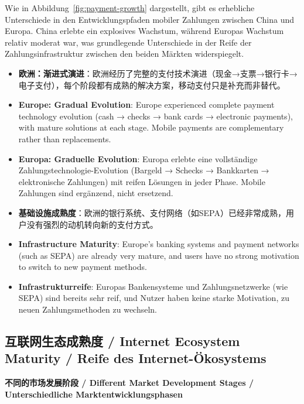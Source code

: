 \documentclass[11pt,a4paper]{article}
\begin{document}
Wie in Abbildung~\ref{fig:payment-growth} dargestellt, gibt es erhebliche Unterschiede in den Entwicklungspfaden mobiler Zahlungen zwischen China und Europa. China erlebte ein explosives Wachstum, während Europas Wachstum relativ moderat war, was grundlegende Unterschiede in der Reife der Zahlungsinfrastruktur zwischen den beiden Märkten widerspiegelt.

\begin{itemize}
    
    \item \textbf{欧洲：渐进式演进}：欧洲经历了完整的支付技术演进（现金→支票→银行卡→电子支付），每个阶段都有成熟的解决方案，移动支付只是补充而非替代。
    \item \textbf{Europe: Gradual Evolution}: Europe experienced complete payment technology evolution (cash → checks → bank cards → electronic payments), with mature solutions at each stage. Mobile payments are complementary rather than replacements.
    \item \textbf{Europa: Graduelle Evolution}: Europa erlebte eine vollständige Zahlungstechnologie-Evolution (Bargeld → Schecks → Bankkarten → elektronische Zahlungen) mit reifen Lösungen in jeder Phase. Mobile Zahlungen sind ergänzend, nicht ersetzend.
    
    \item \textbf{基础设施成熟度}：欧洲的银行系统、支付网络（如SEPA）已经非常成熟，用户没有强烈的动机转向新的支付方式。
    \item \textbf{Infrastructure Maturity}: Europe's banking systems and payment networks (such as SEPA) are already very mature, and users have no strong motivation to switch to new payment methods.
    \item \textbf{Infrastrukturreife}: Europas Bankensysteme und Zahlungsnetzwerke (wie SEPA) sind bereits sehr reif, und Nutzer haben keine starke Motivation, zu neuen Zahlungsmethoden zu wechseln.
\end{itemize}

\subsection{互联网生态成熟度 / Internet Ecosystem Maturity / Reife des Internet-Ökosystems}

\textbf{不同的市场发展阶段 / Different Market Development Stages / Unterschiedliche Marktentwicklungsphasen}
\end{document}

